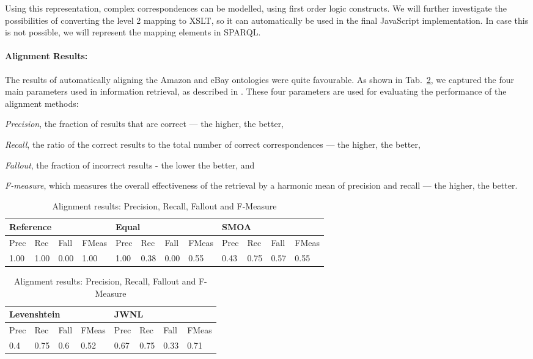 Using this representation, complex correspondences can be modelled, using first order logic constructs. We will further investigate the possibilities of converting the level 2 mapping to XSLT, so it can automatically be used in the final JavaScript implementation. In case this is not possible, we will represent the mapping elements in SPARQL.

\paragraph{Alignment Results:}
The results of automatically aligning the Amazon and eBay ontologies were quite favourable. As shown in Tab.~\ref{table_results}, we captured the four main parameters used in information retrieval, as described in \cite{olson2008advanced}. These four parameters are used for evaluating the performance of the alignment methods: 
\begin{inparaenum}[(1)]
    \item \textit{Precision}, the fraction of results that are correct --- the higher, the better, 
    \item \textit{Recall}, the ratio of the correct results to the total number of correct correspondences --- the higher, the better, 
    \item \emph{Fallout}, the fraction of incorrect results - the lower the better, and 
    \item \emph{F-measure}, which measures the overall effectiveness of the retrieval by a harmonic mean of precision and recall --- the higher, the better.
\end{inparaenum}

\begin{center}
\begin{table}
\caption{Alignment results: Precision, Recall, Fallout and F-Measure}
\label{table_results}

\begin{center}
\begin{tabular}[c]{|llll|llll|llll|} \hline
\multicolumn{4}{|l|}{Reference} & \multicolumn{4}{|l|}{Equal} & 
\multicolumn{4}{|l|}{SMOA}\\ \hline
Prec & Rec & Fall & FMeas & Prec & Rec & Fall & FMeas & Prec & Rec & 
Fall & FMeas  \\ \hline
1.00& 1.00& 0.00& 1.00& 1.00& 0.38& 0.00& 0.55& 0.43& 0.75& 0.57& 0.55 \\ \hline
\end{tabular}
\end{center}

\begin{center}
\begin{tabular}{|llll|llll|} \hline
\multicolumn{4}{|l|}{Levenshtein} & \multicolumn{4}{|l|}{JWNL} \\ \hline
 Prec & Rec & Fall & FMeas & Prec & Rec & Fall & FMeas \\ \hline
0.4& 0.75& 0.6& 0.52& 0.67& 0.75& 0.33& 0.71 \\ \hline
\end{tabular}
\end{center}

\end{table}
\end{center}

